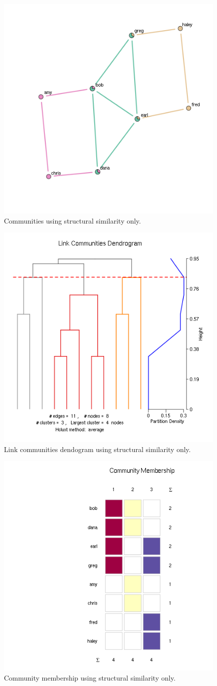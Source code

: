 \documentclass{report}
\begin{document}
\begin{figure}[htp!]
  \centering
  \includegraphics[width=0.65\linewidth]{toy3/no_ea/edge_comm.png}
  \caption{Communities using structural similarity only.}
\end{figure}

\begin{figure}[htp!]
  \centering
  \includegraphics[width=0.65\linewidth]{toy3/no_ea/lc.png}
  \caption{Link communities dendogram using structural similarity only.}
\end{figure}

\begin{figure}[htp!]
  \centering
  \includegraphics[width=0.65\linewidth]{toy3/no_ea/top20.png}
  \caption{Community membership using structural similarity only.}
\end{figure}
\end{document}
